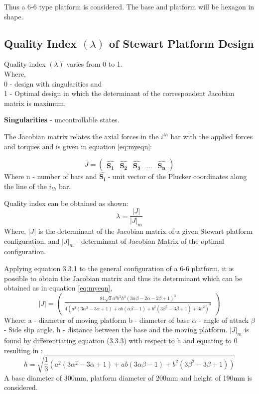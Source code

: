 Thus a 6-6 type platform is considered. The base and platform will be hexagon in shape.

\subsection{Quality Index $(\lambda)$ of Stewart Platform Design}
Quality index $(\lambda)$ varies from 0 to 1.\\
Where,\\
0 - design with singularities and\\
1 - Optimal design in which the determinant of the correspondent Jacobian matrix is maximum.

\textbf{Singularities} - uncontrollable states.

The Jacobian matrix relates the axial forces in the $i^{th}$ bar with the applied
forces and torques and is given in equation \eqref{eq:myeqn}:

\begin{equation}
J =
\begin{pmatrix}
\hat{\boldsymbol{S_{1}}} & \hat{\boldsymbol{S_{2}}} & \hat{\boldsymbol{S_{3}}} & ... & \hat{\boldsymbol{S_{n}}}
\end{pmatrix}
\label{eq:myeqn}
\end{equation}
Where n - number of bars and $ \hat{\boldsymbol{S_{i}}}$ - unit vector of the Plucker coordinates along the line of the
$i_{th}$ bar.

Quality index can be obtained as shown:
\begin{equation}
\lambda = \frac{|J|}{|J|_{m}}
\label{eq:myeqn}
\end{equation}
Where, $|J|$ is the determinant of the Jacobian matrix of a given Stewart platform configuration, and $ |J|_{m} $ - determinant of Jacobian Matrix of the optimal configuration.

Applying equation 3.3.1 to the general configuration of a 6-6 platform, it is
possible to obtain the Jacobian matrix and thus its determinant which can be obtained as in equation \eqref{eq:myeqn},
\begin{equation}
|J| =
\begin{pmatrix}
\frac{81 \sqrt{3} a^3 b^3 h^3 (3 \alpha \beta - 2 \alpha - 2 \beta +1)^3}{4(a^2(3 \alpha^2 - 3 \alpha + 1)+ ab(\alpha \beta - 1 )+ b^2(3 \beta^2 - 3 \beta + 1)+ 3h^2)^3}
\end{pmatrix}
\label{eq:myeqn}
\end{equation}
Where: a - diameter of moving platform
b - diameter of base
$\alpha$ - angle of attack
$ \beta $ - Side slip angle.
h - distance between the base and the moving platform.
$|J|_{m}$ is found by differentiating equation (3.3.3) with respect to h and equating to 0 resulting in \cite{fernandes_design_nodate}:
\begin{equation}
h = \sqrt{\frac{1}{3}(a^2 (3 \alpha^2 - 3 \alpha + 1)+ ab (3\alpha\beta - 1)+b^2(3 \beta^2 - 3 \beta + 1))}
\label{eq:myeqn}
\end{equation}
A base diameter of 300mm, platform diameter of 200mm and height of 190mm is considered.

